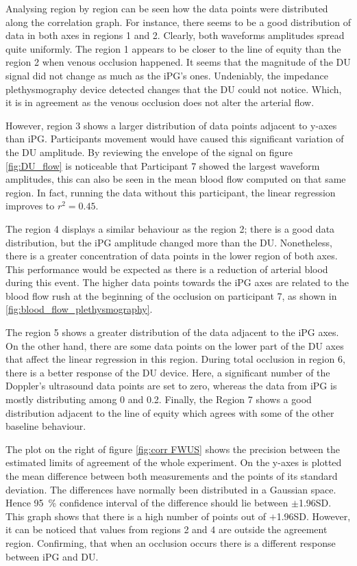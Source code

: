 Analysing region by region can be seen how the data points were distributed along the correlation graph. For instance, there seems to be a good distribution of data in both axes in regions 1 and 2. Clearly, both waveforms amplitudes spread quite uniformly. The region 1 appears to be closer to the line of equity than the region 2 when venous occlusion happened. It seems that the magnitude of the DU signal did not change as much as the iPG's ones. Undeniably, the impedance plethysmography device detected changes that the DU could not notice. Which, it is in agreement as the venous occlusion does not alter the arterial flow. 

However, region 3 shows a larger distribution of data points adjacent to y-axes than iPG. Participants movement would have caused this significant variation of the DU amplitude. By reviewing the envelope of the signal on figure \ref{fig:DU_flow} is noticeable that Participant 7 showed the largest waveform amplitudes, this can also be seen in the mean blood flow computed on that same region. In fact, running the data without this participant, the linear regression improves to $r^2 = 0.45$. 

The region 4 displays a similar behaviour as the region 2; there is a good data distribution, but the iPG amplitude changed more than the DU. Nonetheless, there is a greater concentration of data points in the lower region of both axes. This performance would be expected as there is a reduction of arterial blood during this event. The higher data points towards the iPG axes are related to the blood flow rush at the beginning of the occlusion on participant 7, as shown in \ref{fig:blood_flow_plethysmography}.

The region 5 shows a greater distribution of the data adjacent to the iPG axes. On the other hand, there are some data points on the lower part of the DU axes that affect the linear regression in this region. During total occlusion in region 6, there is a better response of the DU device. Here, a significant number of the Doppler's ultrasound data points are set to zero, whereas the data from iPG is mostly distributing among 0 and 0.2. Finally, the Region 7 shows a good distribution adjacent to the line of equity which agrees with some of the other baseline behaviour.

The plot on the right of figure \ref{fig:corr FWUS} shows the precision between the estimated limits of agreement of the whole experiment.  On the y-axes is plotted the mean difference between both measurements and the points of its standard deviation. The differences have normally been distributed in a Gaussian space. Hence \SI{95}{\percent} confidence interval of the difference should lie between  $\pm$1.96SD. This graph shows that there is a high number of points out of $+$1.96SD. However, it can be noticed that values from regions 2 and 4 are outside the agreement region. Confirming, that when an occlusion occurs there is a different response between iPG and DU.


